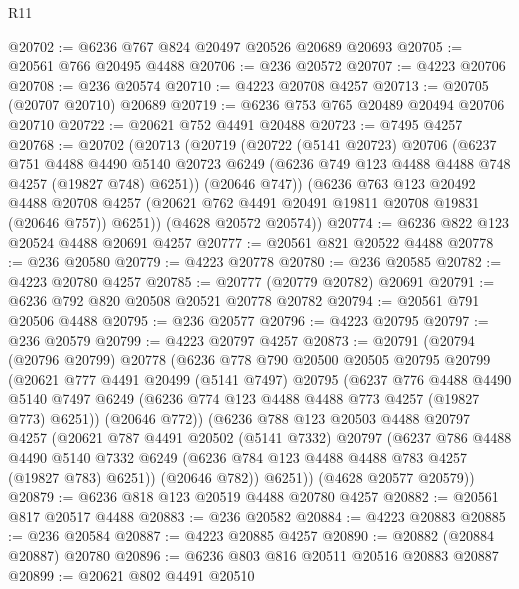 \begin{lexlean}{R11}
\begin{coremodule}
@20702 := @6236 @767 @824 @20497 @20526 @20689 @20693
@20705 := @20561 @766 @20495 @4488
@20706 := @236 @20572
@20707 := @4223 @20706
@20708 := @236 @20574
@20710 := @4223 @20708 @4257
@20713 := @20705 (@20707 @20710) @20689
@20719 := @6236 @753 @765 @20489 @20494 @20706 @20710
@20722 := @20621 @752 @4491 @20488
@20723 := @7495 @4257
@20768 := @20702
    (@20713
      (@20719
        (@20722
          (@5141 @20723)
          @20706
          (@6237
            @751
            @4488
            @4490
            @5140
            @20723
            @6249
            (@6236 @749 @123 @4488 @4488 @748 @4257 (@19827 @748) @6251))
          (@20646 @747))
        (@6236
          @763
          @123
          @20492
          @4488
          @20708
          @4257
          (@20621 @762 @4491 @20491 @19811 @20708 @19831 (@20646 @757))
          @6251))
      (@4628 @20572 @20574))
@20774 := @6236 @822 @123 @20524 @4488 @20691 @4257
@20777 := @20561 @821 @20522 @4488
@20778 := @236 @20580
@20779 := @4223 @20778
@20780 := @236 @20585
@20782 := @4223 @20780 @4257
@20785 := @20777 (@20779 @20782) @20691
@20791 := @6236 @792 @820 @20508 @20521 @20778 @20782
@20794 := @20561 @791 @20506 @4488
@20795 := @236 @20577
@20796 := @4223 @20795
@20797 := @236 @20579
@20799 := @4223 @20797 @4257
@20873 := @20791
    (@20794
      (@20796 @20799)
      @20778
      (@6236
        @778
        @790
        @20500
        @20505
        @20795
        @20799
        (@20621
          @777
          @4491
          @20499
          (@5141 @7497)
          @20795
          (@6237
            @776
            @4488
            @4490
            @5140
            @7497
            @6249
            (@6236 @774 @123 @4488 @4488 @773 @4257 (@19827 @773) @6251))
          (@20646 @772))
        (@6236
          @788
          @123
          @20503
          @4488
          @20797
          @4257
          (@20621
            @787
            @4491
            @20502
            (@5141 @7332)
            @20797
            (@6237
              @786
              @4488
              @4490
              @5140
              @7332
              @6249
              (@6236 @784 @123 @4488 @4488 @783 @4257 (@19827 @783) @6251))
            (@20646 @782))
          @6251))
      (@4628 @20577 @20579))
@20879 := @6236 @818 @123 @20519 @4488 @20780 @4257
@20882 := @20561 @817 @20517 @4488
@20883 := @236 @20582
@20884 := @4223 @20883
@20885 := @236 @20584
@20887 := @4223 @20885 @4257
@20890 := @20882 (@20884 @20887) @20780
@20896 := @6236 @803 @816 @20511 @20516 @20883 @20887
@20899 := @20621 @802 @4491 @20510

\end{coremodule}
\end{lexlean}
